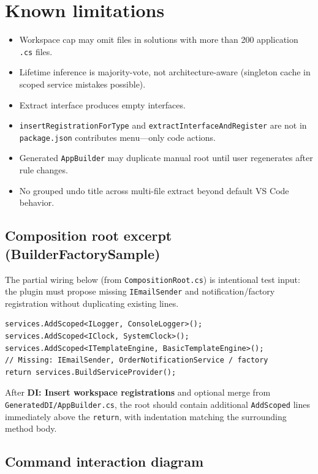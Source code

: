 \section{Known limitations}
\label{chap4:limitations}

\begin{itemize}
	\item Workspace cap may omit files in solutions with more than 200 application \texttt{.cs} files.
	\item Lifetime inference is majority-vote, not architecture-aware (singleton cache in scoped service mistakes possible).
	\item Extract interface produces empty interfaces.
	\item \texttt{insertRegistrationForType} and \texttt{extractInterfaceAndRegister} are not in \texttt{package.json} contributes menu---only code actions.
	\item Generated \texttt{AppBuilder} may duplicate manual root until user regenerates after rule changes.
	\item No grouped undo title across multi-file extract beyond default VS Code behavior.
\end{itemize}

\subsection{Composition root excerpt (BuilderFactorySample)}

The partial wiring below (from \texttt{CompositionRoot.cs}) is intentional test input: the plugin must propose missing \texttt{IEmailSender} and notification/factory registration without duplicating existing lines.

\begin{lstlisting}[caption={Partial CompositionRoot (test input)}]
services.AddScoped<ILogger, ConsoleLogger>();
services.AddScoped<IClock, SystemClock>();
services.AddScoped<ITemplateEngine, BasicTemplateEngine>();
// Missing: IEmailSender, OrderNotificationService / factory
return services.BuildServiceProvider();
\end{lstlisting}

After \textbf{DI: Insert workspace registrations} and optional merge from \texttt{GeneratedDI/AppBuilder.cs}, the root should contain additional \texttt{AddScoped} lines immediately above the \texttt{return}, with indentation matching the surrounding method body.

\subsection{Command interaction diagram}

